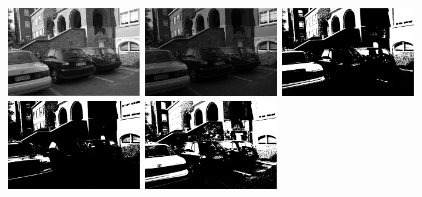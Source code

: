 \documentclass[conference,compsoc]{IEEEtran}
\begin{document}
\begin{figure}[htb]

\begin{minipage}[b]{.48\linewidth}
  \centering
  \centerline{\includegraphics[width=3.5cm]{leuven1}}
\end{minipage}
\hfill
\begin{minipage}[b]{0.48\linewidth}
  \centering
  \centerline{\includegraphics[width=3.5cm]{leuven4}}
\end{minipage}
\hfill
\begin{minipage}[b]{0.48\linewidth}
  \centering
  \centerline{\includegraphics[width=3.5cm]{leuven1_otsu}}
\end{minipage}
\begin{minipage}[b]{.48\linewidth}
  \centering
  \centerline{\includegraphics[width=3.5cm]{leuven4_otsu}}
\end{minipage}
\hfill
\begin{minipage}[b]{0.48\linewidth}
  \centering
  \centerline{\includegraphics[width=3.5cm]{leuven1_numcc}}

\end{minipage}
\end{figure}
\end{document}
